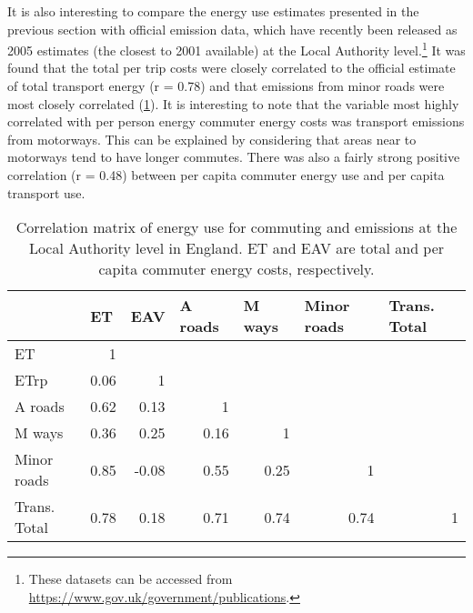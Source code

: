 It is also interesting to compare the energy use estimates presented in the
previous section with official emission data, which have recently been
released as 2005 estimates (the closest to 2001 available) at the Local Authority
level.\footnote{These datasets can be accessed from {\color{blue}
\href{https://www.gov.uk/government/publications/local-authority-emissions-estimates}
{https://www.gov.uk/government/publications}}.
}
It was found that the total per trip costs were closely correlated to the
official estimate of total transport energy (r = 0.78) and that emissions
from minor roads were most closely correlated (\cref{tco2cor}). 
It is interesting to note that the variable most highly correlated
with per person energy commuter energy costs was transport emissions
from motorways. This can be explained by considering that areas near to
motorways tend to have longer commutes. There was also a fairly strong
positive correlation (r = 0.48) between per capita commuter energy use
and per capita transport use.

\begin{table}[htbp]
\caption[Correlation matrix of energy use for commuting and emissions]
{Correlation matrix of energy use for commuting and emissions at the Local
Authority level in England. ET and EAV are total and per capita commuter energy
costs, respectively.}
\begin{tabular}{lrrrrrr}
\toprule
 & \multicolumn{1}{l}{ET} & \multicolumn{1}{l}{EAV} & \multicolumn{1}{l}{A roads} & \multicolumn{1}{l}{M ways} & \multicolumn{1}{l}{Minor roads} & \multicolumn{1}{l}{Trans. Total} \\
 \midrule
ET & 1 &  &  &  &  &  \\
ETrp & 0.06 & 1 &  &  &  &  \\
A roads & 0.62 & 0.13 & 1 &  &  &  \\
M ways & 0.36 & 0.25 & 0.16 & 1 &  &  \\
Minor roads & 0.85 & -0.08 & 0.55 & 0.25  & 1 &  \\
Trans. Total & 0.78 & 0.18 & 0.71 & 0.74 & 0.74 & 1 \\
\bottomrule
\end{tabular}
\label{tco2cor}
\end{table}

